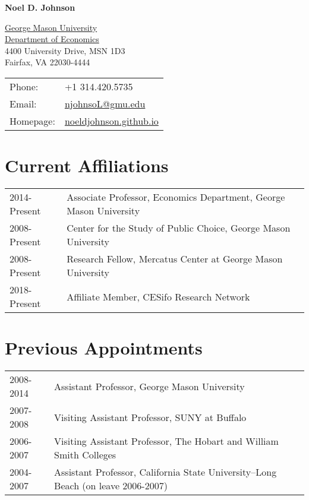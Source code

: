 \documentclass[11pt,fullpage]{article}
\def\name{Noel D. Johnson}
\begin{document}


\centerline{\Large \bf \name}

\vspace{0.25in}

\begin{minipage}{0.50\linewidth}
  \href{http://www.gmu.edu/}{George Mason University} \\
  \href{http://www.gmu.edu/centers/publicchoice/}{Department of Economics} \\
   4400 University Drive, MSN 1D3 \\
  Fairfax, VA 22030-4444
\end{minipage}
\begin{minipage}{0.50\linewidth}
  \begin{tabular}{ll}
    Phone: & +1 314.420.5735 \\
    Email: & \href{mailto:njohnsoL@gmu.edu}{njohnsoL@gmu.edu} \\
    Homepage: & \href{https://noeldjohnson.github.io}{noeldjohnson.github.io} \\
  \end{tabular}
\end{minipage}

\vspace{.25cm}


\section*{Current Affiliations}

\begin{tabular}{ll}
	2014-Present & Associate Professor, Economics Department, George Mason University \\
	2008-Present & Center for the Study of Public Choice, George Mason University \\
	2008-Present & Research Fellow, Mercatus Center at George Mason University \\
	2018-Present & Affiliate Member, CESifo Research Network \\
\end{tabular}

\section*{Previous Appointments}

\begin{tabular}{ll}
	2008-2014 & Assistant Professor, George Mason University \\
	2007-2008 & Visiting Assistant Professor, SUNY at Buffalo \\
	2006-2007 & Visiting Assistant Professor, The Hobart and William Smith Colleges \\
	2004-2007 & Assistant Professor, California State University--Long Beach (on leave 2006-2007) \\
\end{tabular}
\end{document}
